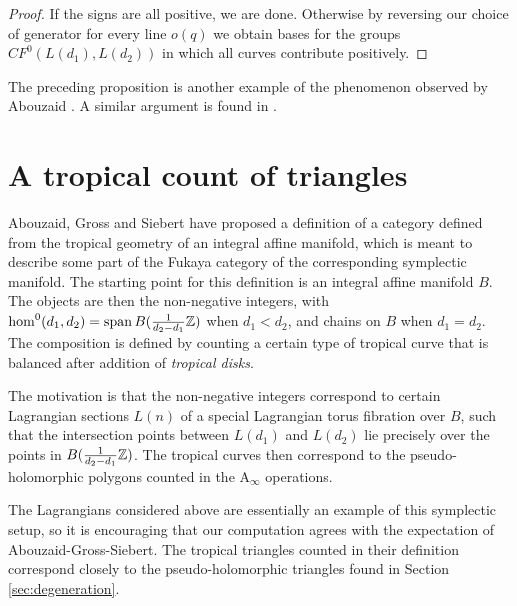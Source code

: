 \documentclass[12pt]{amsart}
\begin{document}
\begin{proof}
If the signs are all positive, we are done. Otherwise by reversing our choice of generator for every line $o(q)$ we obtain bases for the groups $CF^0(L(d_1),L(d_2))$ in which all curves contribute positively.

\end{proof}

\begin{remark}
  The preceding proposition is another example of the phenomenon observed by Abouzaid \cite[Lemma 3.21]{abouzaid06}. A similar argument is found in \cite[(13c)]{seidel-book}.
\end{remark}

\section{A tropical count of triangles}
\label{sec:trop-fuk}
Abouzaid, Gross and Siebert have proposed a definition of a category
defined from the tropical geometry of an integral affine manifold,
which is meant to describe some part of the Fukaya category of the
corresponding symplectic manifold. The starting point for this
definition is an integral affine manifold $B$. The objects are then
the non-negative integers, with $\hom^0(d_1,d_2) = \operatorname{span}
B(\frac{1}{d_2-d_1}\mathbb{Z})$ when $d_1 < d_2$, and chains on $B$ when $d_1
= d_2$. The composition is defined by counting a certain type of
tropical curve that is balanced after addition of \emph{tropical
disks}.

The motivation is that the non-negative integers correspond to certain
Lagrangian sections $L(n)$ of a special Lagrangian torus fibration
over $B$, such that the intersection points between $L(d_1)$ and $L(d_2)$ lie precisely
over the points in $B(\frac{1}{d_2-d_1}\mathbb{Z})$. The tropical curves then
correspond to the pseudo-holomorphic polygons counted in the A$_\infty$ operations.

The Lagrangians considered above are essentially an example of this
symplectic setup, so it is encouraging that our computation agrees
with the expectation of Abouzaid-Gross-Siebert. The tropical triangles
counted in their definition correspond closely to the
pseudo-holomorphic triangles found in Section \ref{sec:degeneration}.
\end{document}
